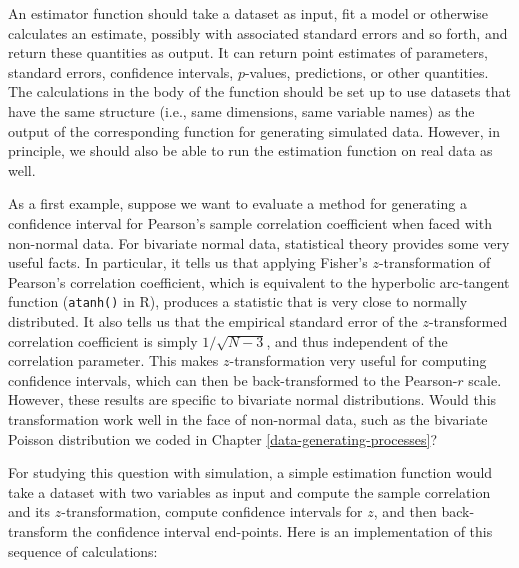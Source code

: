 \documentclass[
]{book}
\begin{document}
An estimator function should take a dataset as input, fit a model or otherwise calculates an estimate, possibly with associated standard errors and so forth, and return these quantities as output.
It can return point estimates of parameters, standard errors, confidence intervals, \(p\)-values, predictions, or other quantities.
The calculations in the body of the function should be set up to use datasets that have the same structure (i.e., same dimensions, same variable names) as the output of the corresponding function for generating simulated data.
However, in principle, we should also be able to run the estimation function on real data as well.

As a first example, suppose we want to evaluate a method for generating a confidence interval for Pearson's sample correlation coefficient when faced with non-normal data.
For bivariate normal data, statistical theory provides some very useful facts.
In particular, it tells us that applying Fisher's \(z\)-transformation of Pearson's correlation coefficient, which is equivalent to the hyperbolic arc-tangent function (\texttt{atanh()} in R), produces a statistic that is very close to normally distributed.
It also tells us that the empirical standard error of the \(z\)-transformed correlation coefficient is simply \(1 / \sqrt{N - 3}\), and thus independent of the correlation parameter.
This makes \(z\)-transformation very useful for computing confidence intervals, which can then be back-transformed to the Pearson-\(r\) scale.
However, these results are specific to bivariate normal distributions.
Would this transformation work well in the face of non-normal data, such as the bivariate Poisson distribution we coded in Chapter \ref{data-generating-processes}?

For studying this question with simulation, a simple estimation function would take a dataset with two variables as input and compute the sample correlation and its \(z\)-transformation, compute confidence intervals for \(z\), and then back-transform the confidence interval end-points.
Here is an implementation of this sequence of calculations:
\end{document}
